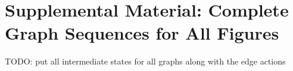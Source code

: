 
\section{Supplemental Material: Complete Graph Sequences for All Figures}%
\label{apx:Supplemental Material: Complete Graph Sequences for All Figures}

TODO: put all intermediate states for all graphs along with the edge actions

